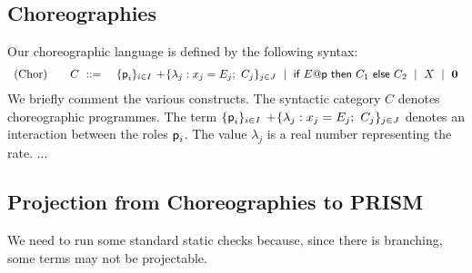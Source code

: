 \newpage


\subsection{Choreographies}

 Our choreographic language is defined by the following
syntax:
%
\begin{displaymath}
  \begin{array}{lll}
    \text{(Chor)}  \quad & C \ ::=\
    & \{\textsf{p}_i\}_{i\in I}\,+\!\{\lambda_j: x_j=E_j;\ C_j\}_{j\in J}
      \ \mid\
      \textsf{if } E@\textsf{p} \textsf{ then } C_1 \textsf{ else } C_2
      \ \mid\
      X
      \ \mid\
      \mathbf{0}
  \end{array}
\end{displaymath}
We briefly comment the various constructs. The syntactic category $C$
denotes choreographic programmes. The term
$\{\role p_i\}_{i\in I}\,+\!\{\lambda_j: x_j=E_j;\ C_j\}_{j\in J}$
denotes an interaction between the roles $\textsf{p}_i$. The value
$\lambda_j$ is a real number representing the rate. ...



\subsection{Projection from Choreographies to PRISM}
 We need to run some standard
static checks because, since there is branching, some terms may not be
projectable.
%

